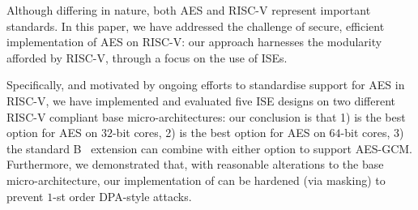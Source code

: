 
Although differing in nature, both AES and RISC-V represent important
standards.  In this paper, we have addressed the challenge of secure, 
efficient implementation of AES on RISC-V: our approach harnesses the
modularity afforded by RISC-V, through a focus on the use of ISEs.

Specifically, and motivated by ongoing efforts to standardise support 
for AES in RISC-V, we have implemented and evaluated five ISE designs 
on two different RISC-V compliant base micro-architectures:
our conclusion is that
1) 
   is the best option for 
   AES on $32$-bit cores,
2) 
   is the best option for 
   AES on $64$-bit cores,
3) the
   standard 
   B~\cite[Section 17]{RV:ISA:I:19}
   extension
   can combine with either option to support AES-GCM.
Furthermore, we demonstrated that, with reasonable alterations to the
base micro-architecture, our implementation of  can be hardened
(via masking) to prevent $1$-st order DPA-style attacks.

%

